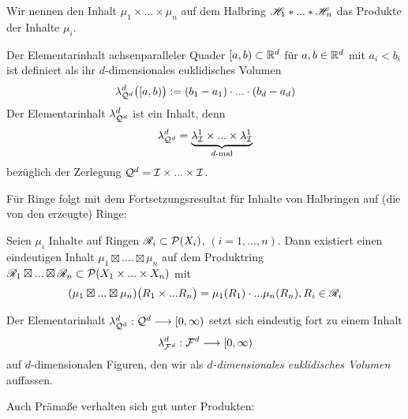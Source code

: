 \begin{definition}
\begin{mdframed}
Wir nennen den Inhalt $\mu_1 \times ... \times \mu_n$ auf dem Halbring $\mathscr{H}_1 \ast ... \ast \mathscr{H}_n$ das Produkte der Inhalte $\mu_i$.
\end{mdframed}
\end{definition}

\begin{hauptbsp}
Der Elementarinhalt achsenparalleler Quader $[a,b) \subset \mathbb{R}^d$ für $a,b \in \mathbb{R}^d$ mit $a_i < b_i$ ist definiert als ihr $d$-dimensionales euklidisches Volumen
$$
\lambda^d_{\mathcal{Q}^d}\big([a,b)\big) := (b_1 -a_1) \cdot ... \cdot (b_d-a_d)
$$
Der Elementarinhalt $\lambda^d_{\mathcal{Q}^d}$ ist ein Inhalt, denn
$$
\lambda^d_{\mathcal{Q}^d} = \underbrace{\lambda^1_\mathcal{I} \times ... \times \lambda^1_\mathcal{I}}_{d\text{-mal}}
$$
bezüglich der Zerlegung $\mathcal{Q}^d = \mathcal{I} \times ... \times \mathcal{I}$.
\end{hauptbsp}

Für Ringe folgt mit dem Fortsetzungsresultat für Inhalte von Halbringen auf (die von den erzeugte) Ringe:

\begin{korollar}
Seien $\mu_i$ Inhalte auf Ringen $\mathscr{R}_i \subset \mathcal{P}(X_i)$, $(i=1,...,n)$. Dann existiert einen eindeutigen Inhalt $\mu_1 \boxtimes .... \boxtimes \mu_n$ auf dem Produktring $\mathscr{R}_1 \boxtimes ... \boxtimes \mathscr{R}_n \subset \mathcal{P}(X_1 \times ... \times X_n)$ mit
$$(\mu_1 \boxtimes ... \boxtimes \mu_n) \big( R_1 \times ... R_n\big) = \mu_1 (R_1) \cdot ... \mu_n(R_n), R_i \in \mathscr{R}_i$$
\end{korollar}

\begin{hauptbsp}
Der Elementarinhalt $\lambda^d_{\mathcal{Q}^d}: \mathcal{Q}^d \longrightarrow [0,\infty)$ setzt sich eindeutig fort zu einem Inhalt
$$
\lambda^d_{\mathcal{F}^d}: \mathcal{F}^d \longrightarrow [0,\infty)
$$
auf $d$-dimensionalen Figuren, den wir als \emph{$d$-dimensionales euklidisches Volumen} auffassen.
\end{hauptbsp}

Auch Prämaße verhalten sich gut unter Produkten:

